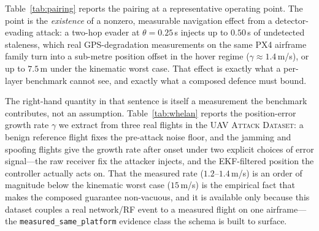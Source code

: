 \documentclass[conference]{IEEEtran}
\newcommand{\dataset}[1]{\textsc{#1}}
\newcommand{\code}[1]{\texttt{#1}}
\begin{document}
Table~\ref{tab:pairing} reports the pairing at a representative operating point.
The point is the \emph{existence} of a nonzero, measurable navigation effect
from a detector-evading attack: a two-hop evader at $\theta{=}0.25$\,s injects up
to $0.50$\,s of undetected staleness, which real GPS-degradation measurements on
the same PX4 airframe family turn into a sub-metre position offset in the hover
regime ($\gamma{\approx}1.4$\,m/s), or up to $7.5$\,m under the kinematic worst
case. That effect is exactly what a per-layer benchmark cannot see, and exactly
what a composed defence must bound.

The right-hand quantity in that sentence is itself a measurement the benchmark
contributes, not an assumption. Table~\ref{tab:whelan} reports the
position-error growth rate $\gamma$ we extract from three real flights in the
\dataset{UAV Attack Dataset}: a benign reference flight fixes the pre-attack
noise floor, and the jamming and spoofing flights give the growth rate after
onset under two explicit choices of error signal---the raw receiver fix the
attacker injects, and the EKF-filtered position the controller actually acts on.
That the measured rate ($1.2$--$1.4$\,m/s) is an order of magnitude below the
kinematic worst case ($15$\,m/s) is the empirical fact that makes the composed
guarantee non-vacuous, and it is available only because this dataset couples a
real network/RF event to a measured flight on one airframe---the
\code{measured\_same\_platform} evidence class the schema is built to surface.

\begin{table}[t]
\centering
\caption{The measured delay-to-position rate $\gamma$ (metres of position error
per second of degradation), from three real \dataset{UAV Attack Dataset} flights,
self-referenced to the pre-attack median. This is the empirical grounding of the
$\delta$ column in \eqref{eq:pairing}; the companion paper consumes the EKF row.}
\label{tab:whelan}
\scriptsize
\renewcommand{\arraystretch}{1.15}

\end{table}

\begin{table}[t]
\centering
\caption{A representative cross-layer pairing: a detector-evading time-delay
attack still induces navigation staleness. Values from the released artifact
(DATAMUt simulation; Whelan 3-flight $\delta$ calibration, hover regime;
EW-Bench MCR).}
\label{tab:pairing}
\small
\renewcommand{\arraystretch}{1.2}

\end{table}
\end{document}
